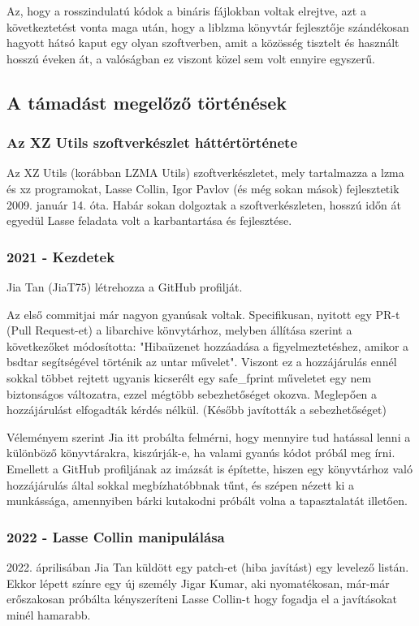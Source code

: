 \documentclass[11pt]{article}
\begin{document}
Az, hogy a rosszindulatú kódok a bináris fájlokban voltak elrejtve, azt a következtetést vonta maga után, hogy a liblzma könyvtár fejlesztője szándékosan hagyott hátsó kaput egy olyan szoftverben, amit a közösség tisztelt és használt hosszú éveken át, a valóságban ez viszont közel sem volt ennyire egyszerű.

\subsection{A támadást megelőző történések}\cite{Boehs_2024}\cite{Cox}\cite{Wikipedia_2024}

\subsubsection{Az XZ Utils szoftverkészlet háttértörténete}
Az XZ Utils (korábban LZMA Utils)  szoftverkészletet, mely tartalmazza a lzma és xz programokat, Lasse Collin, Igor Pavlov (és még sokan mások) fejlesztetik 2009. január 14. óta. Habár sokan dolgoztak a szoftverkészleten, hosszú időn át egyedül Lasse feladata volt a karbantartása és fejlesztése.

\subsubsection{2021 - Kezdetek}

Jia Tan (JiaT75) létrehozza a GitHub profilját.

Az első commitjai már nagyon gyanúsak voltak. Specifikusan, nyitott egy PR-t (Pull Request-et) a libarchive könvytárhoz, melyben állítása szerint a következőket módosította: "Hibaüzenet hozzáadása a figyelmeztetéshez, amikor a bsdtar segítségével történik az untar művelet". Viszont ez a hozzájárulás ennél sokkal többet rejtett ugyanis kicserélt egy safe\_fprint műveletet egy nem biztonságos változatra, ezzel mégtöbb sebezhetőséget okozva.
Meglepően a hozzájárulást elfogadták kérdés nélkül. (Később javították a sebezhetőséget)

Véleményem szerint Jia itt probálta felmérni, hogy mennyire tud hatással lenni a különböző könyvtárakra, kiszúrják-e, ha valami gyanús kódot próbál meg írni.
Emellett a GitHub profiljának az imázsát is építette, hiszen egy könyvtárhoz való hozzájárulás által sokkal megbízhatóbbnak tűnt, és szépen nézett ki a munkássága, amennyiben bárki kutakodni próbált volna a tapasztalatát illetően.

\subsubsection{2022 - Lasse Collin manipulálása}
2022. áprilisában Jia Tan küldött egy patch-et (hiba javítást) egy levelező listán. 
Ekkor lépett színre egy új személy Jigar Kumar, aki nyomatékosan, már-már erőszakosan próbálta kényszeríteni Lasse Collin-t hogy fogadja el a javításokat minél hamarabb.
\end{document}

